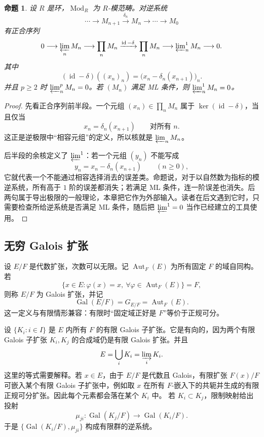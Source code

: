 \documentclass[11pt,a4paper,openany]{ctexbook}
\numberwithin{equation}{chapter}
\newcommand{\Gal}{\operatorname{Gal}}
\theoremstyle{plain}
\newtheorem{proposition}[theorem]{命题}
\theoremstyle{definition}
\theoremstyle{remark}
\begin{document}
\begin{proposition}
设 $R$ 是环，$\operatorname{Mod}_R$ 为 $R$-模范畴。对逆系统
\[
\cdots\longrightarrow M_{n+1}\xrightarrow{\delta_n}M_n\longrightarrow\cdots\longrightarrow M_0
\]
有正合序列
\[
0\longrightarrow \varprojlim_n M_n
\longrightarrow \prod_n M_n
\xrightarrow{\operatorname{id}-\delta}
\prod_n M_n
\longrightarrow \varprojlim\nolimits^1_n M_n
\longrightarrow 0.
\]
其中
\[
(\operatorname{id}-\delta)((x_n)_n)
=\bigl(x_n-\delta_n(x_{n+1})\bigr)_n.
\]
并且 $p\ge2$ 时 $\varprojlim^p_n M_n=0$。若 $(M_n)$ 满足 ML 条件，则 $\varprojlim^1_n M_n=0$。
\end{proposition}

\begin{proof}
先看正合序列前半段。一个元组 $(x_n)\in\prod_nM_n$ 属于 $\ker(\operatorname{id}-\delta)$，当且仅当
\[
x_n=\delta_n(x_{n+1})\qquad\text{对所有 }n.
\]
这正是逆极限中“相容元组”的定义，所以核就是 $\varprojlim_nM_n$。

后半段的余核定义了 $\varprojlim^1$：若一个元组 $(y_n)$ 不能写成
\[
y_n=x_n-\delta_n(x_{n+1})\qquad(n\ge0),
\]
它就代表一个不能通过相容选择消去的误差类。命题说，对于以自然数为指标的模逆系统，所有高于 $1$ 阶的误差都消失；若满足 ML 条件，连一阶误差也消失。后两句属于导出极限的一般理论，本章把它作为外部输入。读者在后文遇到它时，只需要检查所给逆系统是否满足 ML 条件，随后把 $\varprojlim^1=0$ 当作已经建立的工具使用。
\end{proof}

\subsection{无穷 Galois 扩张}

设 $E/F$ 是代数扩张，次数可以无限。记 $\operatorname{Aut}_F(E)$ 为所有固定 $F$ 的域自同构。若
\[
\{x\in E:\varphi(x)=x,\ \forall\varphi\in\operatorname{Aut}_F(E)\}=F,
\]
则称 $E/F$ 为 Galois 扩张，并记
\[
\Gal(E/F)=G_{E/F}=\operatorname{Aut}_F(E).
\]
这一定义与有限情形兼容：有限时“固定域正好是 $F$”等价于正规可分。

设 $\{K_i:i\in I\}$ 是 $E$ 内所有 $F$ 的有限 Galois 子扩张。它是有向的，因为两个有限 Galois 子扩张 $K_i,K_j$ 的合成域仍是有限 Galois 扩张。并且
\[
E=\bigcup_iK_i=\varinjlim_iK_i.
\]
这里的等式需要解释。若 $x\in E$，由于 $E/F$ 是代数且 Galois，有限扩张 $F(x)/F$ 可嵌入某个有限 Galois 子扩张中，例如取 $x$ 在所有 $F$-嵌入下的共轭并生成的有限正规可分扩张。因此每个元素都会落在某个 $K_i$ 中。
若 $K_i\subset K_j$，限制映射给出投射
\[
\mu_{ji}:\Gal(K_j/F)\longrightarrow \Gal(K_i/F).
\]
于是 $\{\Gal(K_i/F),\mu_{ji}\}$ 构成有限群的逆系统。
\end{document}
